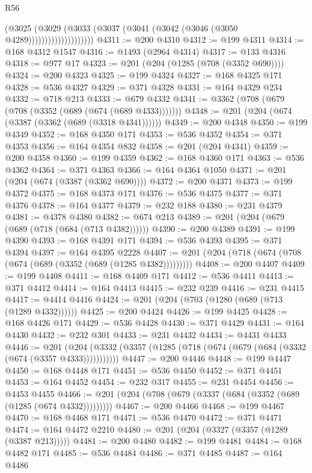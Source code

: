\begin{lexlean}{R56}
\begin{coremodule}
                            (@3025
                              (@3029
                                (@3033 (@3037 (@3041 (@3042 (@3046 (@3050 @4289))))))))))))))))))))
@4311 := @200 @4310
@4312 := @199 @4311
@4314 := @168 @4312 @1547
@4316 := @1493 (@2964 @4314)
@4317 := @133 @4316
@4318 := @977 @17
@4323 := @201 (@204 (@1285 (@708 (@3352 @690))))
@4324 := @200 @4323
@4325 := @199 @4324
@4327 := @168 @4325 @171
@4328 := @536 @4327
@4329 := @371 @4328
@4331 := @164 @4329 @234
@4332 := @718 @213
@4333 := @679 @4332
@4341 := @3362 (@708 (@679 (@708 (@3352 (@689 (@674 (@689 @4333)))))))
@4348 := @201 (@204 (@674 (@3387 (@3362 (@689 (@3318 @4341))))))
@4349 := @200 @4348
@4350 := @199 @4349
@4352 := @168 @4350 @171
@4353 := @536 @4352
@4354 := @371 @4353
@4356 := @164 @4354 @832
@4358 := @201 (@204 @4341)
@4359 := @200 @4358
@4360 := @199 @4359
@4362 := @168 @4360 @171
@4363 := @536 @4362
@4364 := @371 @4363
@4366 := @164 @4364 @1050
@4371 := @201 (@204 (@674 (@3387 (@3362 @690))))
@4372 := @200 @4371
@4373 := @199 @4372
@4375 := @168 @4373 @171
@4376 := @536 @4375
@4377 := @371 @4376
@4378 := @164 @4377
@4379 := @232 @188
@4380 := @231 @4379
@4381 := @4378 @4380
@4382 := @674 @213
@4389 := @201 (@204 (@679 (@689 (@718 (@684 (@713 @4382))))))
@4390 := @200 @4389
@4391 := @199 @4390
@4393 := @168 @4391 @171
@4394 := @536 @4393
@4395 := @371 @4394
@4397 := @164 @4395 @2228
@4407 := @201 (@204 (@718 (@674 (@708 (@674 (@689 (@3352 (@689 (@1285 @4382)))))))))
@4408 := @200 @4407
@4409 := @199 @4408
@4411 := @168 @4409 @171
@4412 := @536 @4411
@4413 := @371 @4412
@4414 := @164 @4413
@4415 := @232 @239
@4416 := @231 @4415
@4417 := @4414 @4416
@4424 := @201 (@204 (@703 (@1280 (@689 (@713 (@1289 @4332))))))
@4425 := @200 @4424
@4426 := @199 @4425
@4428 := @168 @4426 @171
@4429 := @536 @4428
@4430 := @371 @4429
@4431 := @164 @4430
@4432 := @232 @301
@4433 := @231 @4432
@4434 := @4431 @4433
@4446 := @201
    (@204 (@3332 (@3357 (@1285 (@718 (@674 (@679 (@684 (@3332 (@674 (@3357 @4333)))))))))))
@4447 := @200 @4446
@4448 := @199 @4447
@4450 := @168 @4448 @171
@4451 := @536 @4450
@4452 := @371 @4451
@4453 := @164 @4452
@4454 := @232 @317
@4455 := @231 @4454
@4456 := @4453 @4455
@4466 := @201 (@204 (@708 (@679 (@3337 (@684 (@3352 (@689 (@1285 (@674 @4332)))))))))
@4467 := @200 @4466
@4468 := @199 @4467
@4470 := @168 @4468 @171
@4471 := @536 @4470
@4472 := @371 @4471
@4474 := @164 @4472 @2210
@4480 := @201 (@204 (@3327 (@3357 (@1289 (@3387 @213)))))
@4481 := @200 @4480
@4482 := @199 @4481
@4484 := @168 @4482 @171
@4485 := @536 @4484
@4486 := @371 @4485
@4487 := @164 @4486

\end{coremodule}
\end{lexlean}
